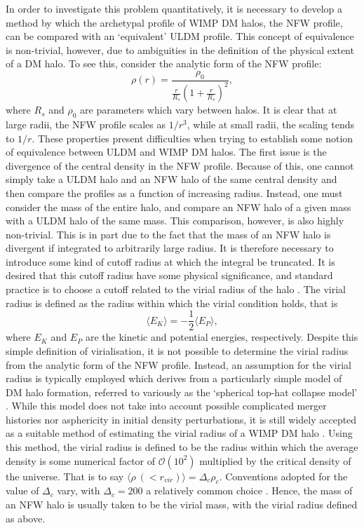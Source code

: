In order to investigate this problem quantitatively, it is necessary to develop a method by which the archetypal profile of WIMP DM halos, the NFW profile, can be compared with an `equivalent' ULDM profile. This concept of equivalence is non-trivial, however, due to ambiguities in the definition of the physical extent of a DM halo. To see this, consider the analytic form of the NFW profile:
\begin{equation}
    \rho(r)=\frac{\rho_0}{\frac{r}{R_s}\left(1+\frac{r}{R_s}\right)^2},
\end{equation}
where $R_s$ and $\rho_0$ are parameters which vary between halos. It is clear that at large radii, the NFW profile scales as $1/r^3$, while at small radii, the scaling tends to $1/r$. These properties present difficulties when trying to establish some notion of equivalence between ULDM and WIMP DM halos. The first issue is the divergence of the central density in the NFW profile. Because of this, one cannot simply take a ULDM halo and an NFW halo of the same central density and then compare the profiles as a function of increasing radius. Instead, one must consider the mass of the entire halo, and compare an NFW halo of a given mass with a ULDM halo of the same mass. This comparison, however, is also highly non-trivial. This is in part due to the fact that the mass of an NFW halo is divergent if integrated to arbitrarily large radius. It is therefore necessary to introduce some kind of cutoff radius at which the integral be truncated. It is desired that this cutoff radius have some physical significance, and standard practice is to choose a cutoff related to the virial radius of the halo \cite{White:2000jv}. The virial radius is defined as the radius within which the virial condition holds, that is 
\begin{equation}
    \langle E_K\rangle = -\frac{1}{2}\langle E_P\rangle,
\end{equation}
where $E_K$ and $E_P$ are the kinetic and potential energies, respectively. Despite this simple definition of virialisation, it is not possible to determine the virial radius from the analytic form of the NFW profile. Instead, an assumption for the virial radius is typically employed which derives from a particularly simple model of DM halo formation, referred to variously as the `spherical top-hat collapse model' \cite{Herrera:2017epn}. While this model does not take into account possible complicated merger histories nor asphericity in initial density perturbations, it is still widely accepted as a suitable method of estimating the virial radius of a WIMP DM halo \cite{Suto:2015jdt, 2010arXiv1005.0411C}. Using this method, the virial radius is defined to be the radius within which the average density is some numerical factor of $\mathcal{O}(10^2)$ multiplied by the critical density of the universe.  That is to say $\langle \rho\ (<r_{vir})\rangle = \Delta_c\rho_c$. Conventions adopted for the value of $\Delta_c$ vary, with $\Delta_c=200$ a relatively common choice \cite{Zemp:2013bga}. Hence, the mass of an NFW halo is usually taken to be the virial mass, with the virial radius defined as above.


